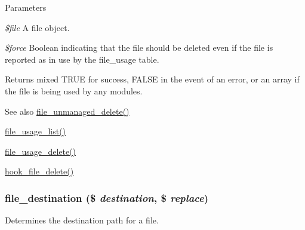 \begin{DoxyParams}{Parameters}
\item[{\em \$file}]A file object. \item[{\em \$force}]Boolean indicating that the file should be deleted even if the file is reported as in use by the file\_\-usage table.\end{DoxyParams}
\begin{DoxyReturn}{Returns}
mixed TRUE for success, FALSE in the event of an error, or an array if the file is being used by any modules.
\end{DoxyReturn}
\begin{DoxySeeAlso}{See also}
\hyperlink{group__file_ga336a7e83da1397131e665d1c6e97fc83}{file\_\-unmanaged\_\-delete()} 

\hyperlink{group__file_ga6399c4096559ffbe81cfcb22db782bc4}{file\_\-usage\_\-list()} 

\hyperlink{group__file_gaf8562c4494373ec51079bb0999a8ae3a}{file\_\-usage\_\-delete()} 

\hyperlink{group__hooks_gafa88683ad014451b3fbc9ca9bb80afdd}{hook\_\-file\_\-delete()} 
\end{DoxySeeAlso}
\hypertarget{group__file_ga3136d98d6189607e6cba12aaff55c66d}{
\subsubsection[{file\_\-destination}]{\setlength{\rightskip}{0pt plus 5cm}file\_\-destination (\$ {\em destination}, \/  \$ {\em replace})}}
\label{group__file_ga3136d98d6189607e6cba12aaff55c66d}
Determines the destination path for a file.


